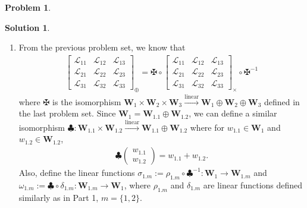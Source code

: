 \documentclass{article}
\theoremstyle{definition}
\newtheorem*{prob*}{Problem}
\newtheorem*{sln*}{Solution}
\newcommand{\W}{\mathbf{W}}
\newcommand{\lag}{\mathcal{L}}
\newcommand{\lin}{\overset{\text{linear}}{\longrightarrow}}
\begin{document}
\begin{prob*}
\begin{sln*}
\begin{enumerate}
		\item From the previous problem set, we know that
		\begin{align*}
		\begin{bmatrix}
		\lag_{11} & \lag_{12} & \lag_{13}\\
		\lag_{21} & \lag_{22} & \lag_{23}\\
		\lag_{31} & \lag_{32} & \lag_{33}
		\end{bmatrix}_\oplus = \maltese \circ \begin{bmatrix}
		\lag_{11} & \lag_{12} & \lag_{13}\\
		\lag_{21} & \lag_{22} & \lag_{23}\\
		\lag_{31} & \lag_{32} & \lag_{33}
		\end{bmatrix}_\times \circ \maltese^{-1}
		\end{align*}
		where $\maltese$ is the isomorphism $\W_1 \times \W_2 \times \W_3 \lin \W_1\oplus\W_2\oplus\W_3$ defined in the last problem set. Since $\W_1 = \W_{1.1}\oplus\W_{1.2}$, we can define a similar isomorphism $\clubsuit : \W_{1.1}\times \W_{1.2} \lin \W_{1.1}\oplus\W_{1.2}$ where for $w_{1.1}\in \W_1$ and $w_{1.2}\in \W_{1.2}$,
		\begin{align*}
		\clubsuit\begin{pmatrix}
		w_{1.1}\\w_{1.2}
		\end{pmatrix} = w_{1.1} + w_{1.2}.
		\end{align*}
		Also, define the linear functions $\sigma_{1.m} := \rho_{1.m}\circ \clubsuit^{-1} : \W_1 \to \W_{1.m}$ and $\omega_{1.m} := \clubsuit \circ \delta_{1.m} : \W_{1.m} \to \W_{1}$, where $\rho_{1.m}$ and $\delta_{1.m}$ are linear functions defined similarly as in Part 1, $m=\{1,2\}$. \\  
		

\end{enumerate}
\end{sln*}
\end{prob*}
\end{document}
